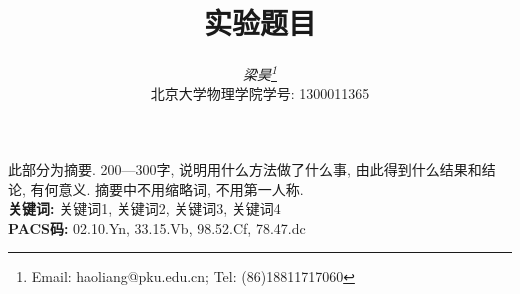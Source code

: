 \documentclass[12pt,a4paper]{article}
\def\chntoday{\normalsize {\bf 日期: }\the\year~年~\the\month~月~\the\day~日}
\begin{document}
\title{\bf\Large 实验题目}
\author{{\it\large 梁昊\footnote{Email: haoliang@pku.edu.cn; Tel: (86)18811717060}} \\ {\normalsize 北京大学物理学院\quad 学号: 1300011365}}
\date{}%

\maketitle

\abstract
\begin{spacing}{1.5}
此部分为摘要. 200—300字, 说明用什么方法做了什么事, 由此得到什么结果和结论, 有何意义. 摘要中不用缩略词, 不用第一人称.\vspace{20pt}\\
\noindent
{\bf 关键词: } 关键词1, 关键词2, 关键词3, 关键词4 \\ %
\noindent
{\bf PACS码: }02.10.Yn, 33.15.Vb, 98.52.Cf, 78.47.dc %
\end{spacing}
\end{document}
